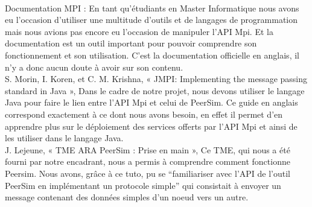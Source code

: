 \documentclass{article}
\begin{document}
		\\[2mm]
		Documentation MPI : En tant qu’étudiants en Master Informatique nous avons eu l’occasion d’utiliser une multitude d’outils et de langages de programmation mais nous avions pas encore eu l’occasion de manipuler l’API Mpi. Et la documentation est un outil important pour pouvoir comprendre son fonctionnement et son utilisation. C’est la documentation officielle en anglais, il n’y a donc aucun doute à avoir sur son contenu.
		\\[2mm]
		S. Morin, I. Koren, et C. M. Krishna, « JMPI: Implementing the message passing standard in Java », Dans le cadre de notre projet, nous devons utiliser le langage Java pour faire le lien entre l’API Mpi et celui de PeerSim. Ce guide en anglais correspond exactement à ce dont nous avons besoin, en effet il permet d’en apprendre plus sur le déploiement des services offerts par l’API Mpi et ainsi de les utiliser dans le langage Java.
		\\[2mm]
		 J. Lejeune, « TME ARA PeerSim : Prise en main »,  Ce TME, qui nous a été fourni par notre encadrant, nous a permis à comprendre comment fonctionne Peersim. Nous avons, grâce à ce tuto, pu se “familiariser avec l’API de l’outil PeerSim en implémentant un protocole simple” qui consistait à envoyer un message contenant des données simples d’un noeud vers un autre.
\end{document}
